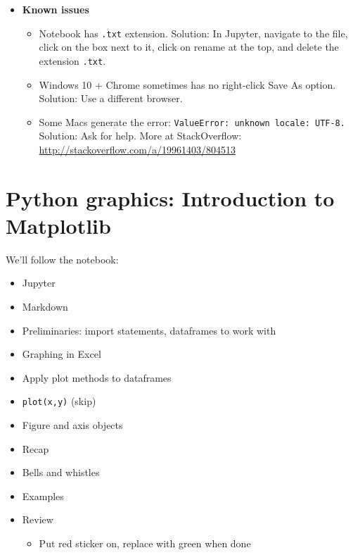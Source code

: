 \documentclass[11pt]{article}
\begin{document}
\begin{itemize}
\item {\bf Known issues}
\begin{itemize}
\item Notebook has {\tt .txt} extension.  Solution:  In Jupyter, navigate to the file,
click on the box next to it, click on rename at the top, and delete the extension
{\tt .txt}.
\item Windows 10 + Chrome sometimes has no right-click Save As option.
Solution:  Use a different browser.
\item Some Macs generate the error:  {\tt ValueError: unknown locale: UTF-8.}
Solution:  Ask for help. More at StackOverflow:
\url{http://stackoverflow.com/a/19961403/804513}

\begin{comment}
Or maybe:   
import sys
reload sys
sys.setdefaultencoding('utf-8') 
https://youtu.be/5JnMutdy6Fw?t=43m23s
\end{comment} 

\end{itemize}
\end{itemize}


\section*{Python graphics:  Introduction to Matplotlib}

We'll follow the notebook:
\begin{itemize}
\item Jupyter
\item Markdown
\item Preliminaries:  import statements, dataframes to work with
\item Graphing in Excel
\item Apply plot methods to dataframes
\item {\tt plot(x,y)} (skip)
\item Figure and axis objects
\item Recap
\item Bells and whistles
\item Examples
\item Review
\begin{itemize}
\item Put red sticker on, replace with green when done
\end{itemize}
\end{itemize}


\begin{comment}
\section*{Examples}

If time permits, we'll go through some examples of economic and financial data
and its properties.  It's an IPython notebook that you can view on the GitHub repo:
the \verb|Code/IPython| directory,
file \verb|bootcamp_examples.ipynb|.
\end{comment}
\end{document}

